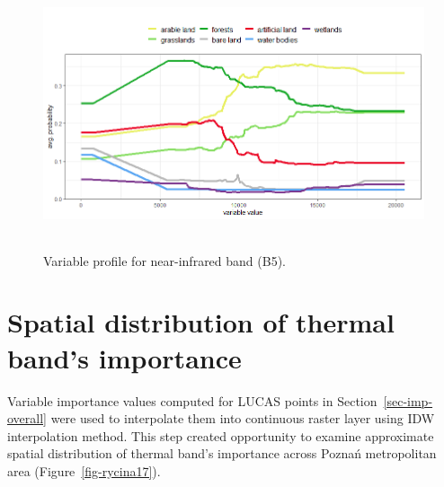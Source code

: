 \documentclass{amuthesis}
\begin{document}
\begin{figure}[H]

{\centering \includegraphics[width=5.90625in,height=3.125in]{./figures/profB5.png}

}

\caption{\label{fig-rycina16}Variable profile for near-infrared band
(B5).}

\end{figure}

\hypertarget{sec-imp-spat}{%
\section{Spatial distribution of thermal band's
importance}\label{sec-imp-spat}}

Variable importance values computed for LUCAS points in
Section~\ref{sec-imp-overall} were used to interpolate them into
continuous raster layer using IDW interpolation method. This step
created opportunity to examine approximate spatial distribution of
thermal band's importance across Poznań metropolitan area
(Figure~\ref{fig-rycina17}).
\end{document}
